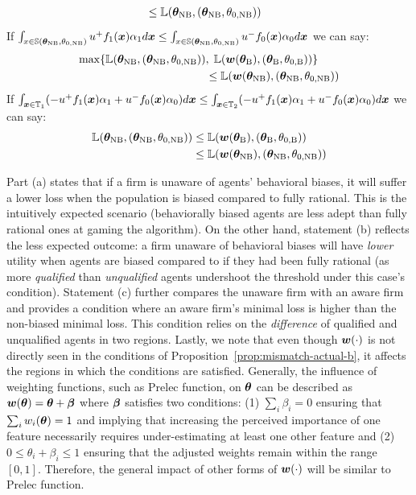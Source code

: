 \begin{proposition}
\begin{align}
        &\le {\mathbb{L}}({\bm{\theta}}_\text{NB}, ({\bm{\theta}}_\text{NB}, \theta_{0, \text{NB}}))
    \end{align}
     If $\int_{x\in {\mathbb{S}}({\bm{\theta}}_\text{NB}, \theta_{0, \text{NB}})} u^+ f_1({\bm{x}})\alpha_1 d{\bm{x}} \le \int_{x\in {\mathbb{S}}({\bm{\theta}}_\text{NB}, \theta_{0, \text{NB}})} u^- f_0({\bm{x}})\alpha_0 d{\bm{x}} $ we can say: 
    \begin{align}\label{eq:firm-loss-comp-hurt}
        \max\{{\mathbb{L}}({\bm{\theta}}_\text{NB}, ({\bm{\theta}}_\text{NB}, \theta_{0, \text{NB}}))&,\; {\mathbb{L}}({\bm{w}}({\bm{\theta}}_\text{B}), ({\bm{\theta}}_\text{B}, \theta_{0, \text{B}}))\}\notag\\
        &\le {\mathbb{L}}({\bm{w}}({\bm{\theta}}_\text{NB}), ({\bm{\theta}}_\text{NB}, \theta_{0, \text{NB}}))
    \end{align}
     If $\int_{{\bm{x}}\in{\mathbb{T}}_1}(-u^+f_1({\bm{x}})\alpha_1+u^-f_0({\bm{x}})\alpha_0)d{\bm{x}} \le \int_{{\bm{x}}\in{\mathbb{T}}_2}(-u^+f_1({\bm{x}})\alpha_1+u^-f_0({\bm{x}})\alpha_0)d{\bm{x}}$ we can say:
    \begin{align}\label{eq:firm-loss-comp-hurt-NB-B}
        {\mathbb{L}}({\bm{\theta}}_\text{NB}, ({\bm{\theta}}_\text{NB}, \theta_{0, \text{NB}}))&\le {\mathbb{L}}({\bm{w}}({\bm{\theta}}_\text{B}), ({\bm{\theta}}_\text{B}, \theta_{0, \text{B}}))\notag\\
        &\le {\mathbb{L}}({\bm{w}}({\bm{\theta}}_\text{NB}), ({\bm{\theta}}_\text{NB}, \theta_{0, \text{NB}}))
    \end{align}
\end{proposition}
Part (a) states that if a firm is unaware of agents' behavioral biases, it will suffer a lower loss when the population is biased compared to fully rational. This is the intuitively expected scenario (behaviorally biased agents are less adept than fully rational ones at gaming the algorithm). On the other hand, statement (b) reflects the less expected outcome: a firm unaware of behavioral biases will have \emph{lower} utility when agents are biased compared to if they had been fully rational (as more \emph{qualified} than \emph{unqualified} agents undershoot the threshold under this case's condition). Statement (c) further compares the unaware firm with an aware firm and provides a condition where an aware firm's minimal loss is higher than the non-biased minimal loss. This condition relies on the \emph{difference} of qualified and unqualified agents in two regions.
Lastly, we note that even though ${\bm{w}}(\cdot)$ is not directly seen in the conditions of Proposition~\ref{prop:mismatch-actual-b}, it affects the regions in which the conditions are satisfied. Generally, the influence of weighting functions, such as Prelec function, on ${\bm{\theta}}$ can be described as ${\bm{w}}({\bm{\theta}}) = {\bm{\theta}} + {\bm{\beta}}$ where ${\bm{\beta}}$ satisfies two conditions: (1) $\sum_i \beta_i = 0$ ensuring that $\sum_i w_i({\bm{\theta}}) = 1$ and implying that increasing the perceived importance of one feature necessarily requires under-estimating at least one other feature and (2) $0\le \theta_i + \beta_i \le 1$ ensuring that the adjusted weights remain within the range $[0,1]$. Therefore, the general impact of other forms of ${\bm{w}}(\cdot)$ will be similar to Prelec function.

